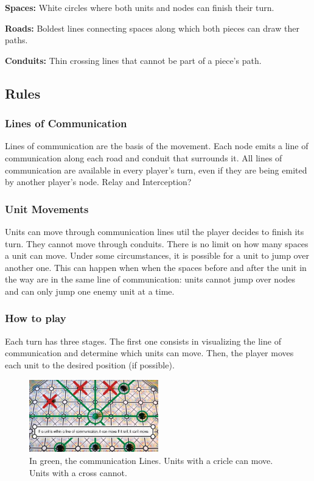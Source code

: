 \documentclass[a4paper]{article}
\begin{document}
\textbf{Spaces: }White circles where both units and nodes can finish their turn.

\textbf{Roads: }Boldest lines connecting spaces along which both pieces can draw ther paths.

\textbf{Conduits: }Thin crossing lines that cannot be part of a piece's path.


\subsection{Rules}

\subsubsection{Lines of Communication}

Lines of communication are the basis of the movement. Each node emits a line of communication along each road and conduit that surrounds it. All lines of communication are available in every player's turn, even if they are being emited by another player's node. 
Relay and Interception?


\subsubsection{Unit Movements}

Units can move through communication lines util the player decides to finish its turn. They cannot move through conduits. There is no limit on how many spaces a unit can move.
Under some circumstances, it is possible for a unit to jump over another one. This can happen when when the spaces before and after the unit in the way are in the same line of communication: units cannot jump over nodes and can only jump one enemy unit at a time.



\subsubsection{How to play}
Each turn has three stages. The first one consists in visualizing the line of communication and determine which units can move. Then, the player moves each unit to the desired position (if possible).
\begin{figure}[h!]
	\centering
	\includegraphics[width=0.5\textwidth]{signallines.jpg}
	\caption{In green, the communication Lines. Units with a cricle can move. Units with a cross cannot.}
	\label{Image: signallines}
\end{figure}
\end{document}
